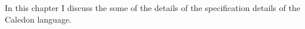 In this chapter I discuss the some of the details of the 
specification details of the Caledon language.